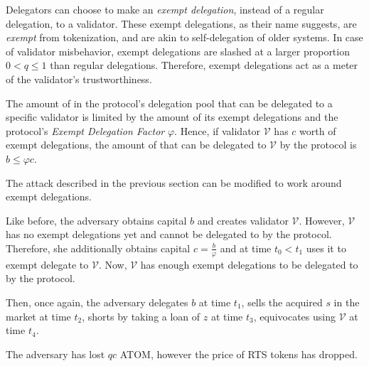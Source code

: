 Delegators can choose to make an \emph{exempt delegation},
instead of a regular delegation, to a validator.
These exempt delegations, as their name suggests,
are \emph{exempt} from tokenization,
and are akin to self-delegation of older systems.
In case of validator misbehavior, exempt delegations
are slashed at a larger proportion $0 < q \leq 1$ than regular delegations.
Therefore, exempt delegations act as a meter of the
validator's trustworthiness.


The amount of \asset in the protocol's delegation pool that can be
delegated to a specific validator is limited by the amount of its
exempt delegations and the protocol's \emph{Exempt Delegation Factor} $\varphi$.
Hence, if validator $\mathcal{V}$ has $c$ \asset worth of exempt delegations,
the amount of \asset that can be delegated to $\mathcal{V}$ by the protocol
is $b \leq \varphi c$.

The attack described in the previous section can be modified to work
around exempt delegations.

Like before, the adversary obtains capital $b$ \asset and creates
validator $\mathcal{V}$.
However, $\mathcal{V}$ has no exempt delegations yet and cannot be delegated to
by the protocol.
Therefore, she additionally obtains capital $c = \frac{b}{\varphi}$ \asset
and at time $t_0 < t_1$ uses it to exempt delegate to $\mathcal{V}$.
Now, $\mathcal{V}$ has enough exempt delegations to be delegated to by the protocol.

Then, once again, the adversary delegates $b$ \asset at time $t_1$,
sells the acquired $s$ \stasset in the market at time $t_2$, shorts \stasset by taking a loan
of $z$ \stasset at time $t_3$, equivocates using $\mathcal{V}$ at time $t_4$.


The adversary has lost $qc$ ATOM, however the price of RTS
tokens has dropped.

